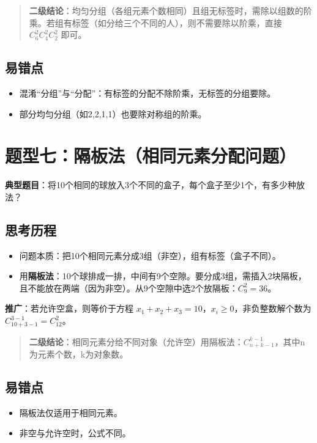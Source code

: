\documentclass[10pt]{article}
\begin{document}
\begin{quote}
\textbf{二级结论}：均匀分组（各组元素个数相同）且组无标签时，需除以组数的阶乘。若组有标签（如分给三个不同的人），则不需要除以阶乘，直接 \(C_6^2 C_4^2 C_2^2\) 即可。
\end{quote}

\subsection*{易错点}
\begin{itemize}
\item 混淆“分组”与“分配”：有标签的分配不除阶乘，无标签的分组要除。
\item 部分均匀分组（如2,2,1,1）也要除对称组的阶乘。
\end{itemize}

\section{题型七：隔板法（相同元素分配问题）}

\textbf{典型题目}：将10个相同的球放入3个不同的盒子，每个盒子至少1个，有多少种放法？

\subsection*{思考历程}
\begin{itemize}
\item 问题本质：把10个相同元素分成3组（非空），组有标签（盒子不同）。
\item 用\textbf{隔板法}：10个球排成一排，中间有9个空隙。要分成3组，需插入2块隔板，且不能放在两端（因为非空）。从9个空隙中选2个放隔板：\(C_9^2 = 36\)。
\end{itemize}

\textbf{推广}：若允许空盒，则等价于方程 \(x_1+x_2+x_3=10\)，\(x_i \ge 0\)，非负整数解个数为 \(C_{10+3-1}^{3-1}=C_{12}^2\)。

\begin{quote}
\textbf{二级结论}：相同元素分给不同对象（允许空）用隔板法：\(C_{n+k-1}^{k-1}\)，其中n为元素个数，k为对象数。
\end{quote}

\subsection*{易错点}
\begin{itemize}
\item 隔板法仅适用于相同元素。
\item 非空与允许空时，公式不同。
\end{itemize}
\end{document}
